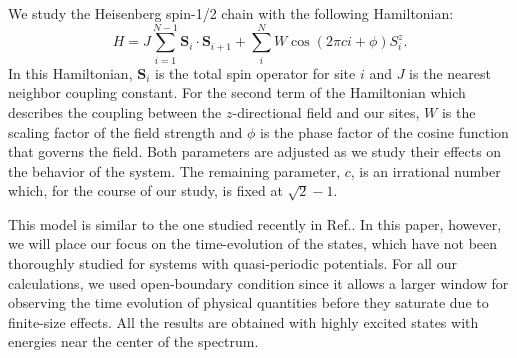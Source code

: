 \documentclass[prl,aps,epsf,showpacs,twocolumn]{revtex4}
\begin{document}
We study the Heisenberg spin-1/2 chain with the following Hamiltonian:
\begin{equation*}
  H = J\sum_{i=1}^{N-1} \mathbf{S}_i \cdot \mathbf{S}_{i+1}
  + \sum_{i}^{N} W\cos(2\pi c i+\phi) S_i^z \text{.}
\end{equation*}
In this Hamiltonian, $\mathbf{S}_i$ is the total spin operator for site $i$ and
$J$ is the nearest neighbor coupling constant.
For the second term of the Hamiltonian which describes the coupling between the
$z$-directional field and our sites, $W$ is the scaling factor of the field
strength and $\phi$ is the phase factor of the cosine function that governs the
field.
Both parameters are adjusted as we study their effects on the behavior of the
system.
The remaining parameter, $c$, is an irrational number which, for the course of
our study, is fixed at $\sqrt{2} - 1$.

This model is similar to the one studied recently in Ref.\cite{vedika2016}.
In this paper, however, we will place our focus on the time-evolution of the
states, which have not been thoroughly studied for systems with quasi-periodic
potentials.
For all our calculations, we used open-boundary condition since it allows a
larger window for observing the time evolution of physical
quantities\cite{luitz2016time} before they saturate due to finite-size effects.
All the results are obtained with highly excited states with energies near the
center of the spectrum.
\end{document}

